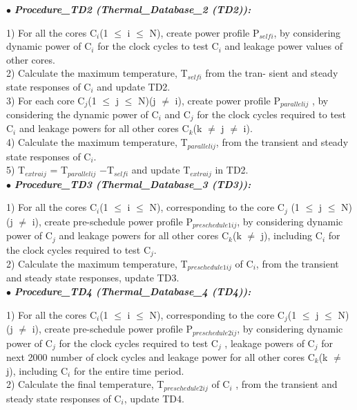 \documentclass[conference]{IEEEtran}
\begin{document}
$\bullet$ \textbf{\textit{Procedure\_TD2 (Thermal\_Database\_2 (TD2)):}}

	\par
	1) For all the cores C$_{i}$(1 $\leq$ i $\leq$ N), create power profile
P$_{selfi}$, by considering dynamic power of C$_{i}$ for the clock
cycles to test C$_{i}$ and leakage power values of other cores.\\
\hspace*{.33 cm}2) Calculate the maximum temperature, T$_{selfi}$ from the tran-
sient and steady state responses of C$_{i}$ and update TD2.\\
\hspace*{.33 cm}3) For each core C$_{j}$(1 $\leq$ j $\leq$ N)(j $\neq$ i), create power profile
P$_{parallelij}$ , by considering the dynamic power of C$_{i}$ and C$_{j}$
for the clock cycles required to test C$_{i}$ and leakage powers
for all other cores C$_{k}$(k $\neq$ j $\neq$ i).\\
\hspace*{.33 cm}4) Calculate the maximum temperature, T$_{parallelij}$, from the
transient and steady state responses of C$_{i}$.\\
\hspace*{.33 cm}5) T$_{extraij}$ = T$_{parallelij}$ −T$_{selfi}$ and update T$_{extraij}$ in TD2.\\

$\bullet$ \textbf{\textit{Procedure\_TD3 (Thermal\_Database\_3 (TD3)):}}

	\par
	1) For all the cores C$_{i}$(1 $\leq$ i $\leq$ N), corresponding to the core
C$_{j}$ (1 $\leq$ j $\leq$ N)(j $\neq$ i), create pre-schedule power profile
P$_{preschedule1ij}$, by considering dynamic power of C$_{j}$ and
leakage powers for all other cores C$_{k}$(k $\neq$ j), including C$_{i}$
for the clock cycles required to test C$_{j}$.\\
\hspace*{.33 cm}2) Calculate the maximum temperature, T$_{preschedule1ij}$ of C$_{i}$,
from the transient and steady state responses, update TD3.\\

$\bullet$ \textbf{\textit{Procedure\_TD4 (Thermal\_Database\_4 (TD4)):}}

	\par
	1) For all the cores C$_{i}$(1 $\leq$ i $\leq$ N), corresponding to the
core C$_{j}$(1 $\leq$ j $\leq$ N)(j $\neq$ i), create pre-schedule power
profile P$_{preschedule2ij}$, by considering dynamic power of C$_{j}$
for the clock cycles required to test C$_{j}$ , leakage powers of
C$_{j}$ for next 2000 number of clock cycles and leakage power
for all other cores C$_{k}$(k $\neq$ j), including C$_{i}$ for the entire
time period.\\
\hspace*{.33 cm}2) Calculate the final temperature, T$_{preschedule2ij}$ of C$_{i}$ , from
the transient and steady state responses of C$_{i}$, update TD4.\\
\end{document}
